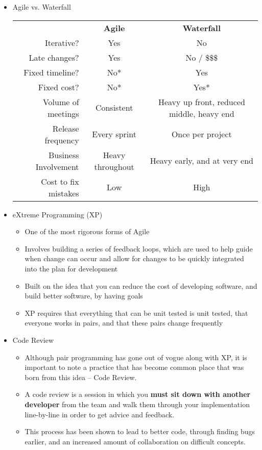 \begin{itemize}
	\item Agile vs. Waterfall\\
		\begin{table}[h]
			\centering
		\begin{tabular}{| r | c c |}
			\hline
			& \textbf{Agile} & \textbf{Waterfall}\\
			\cline{2-3}%
			Iterative? & \cellcolor{green!25}Yes & \cellcolor{green!15}No\\
			Late changes? & \cellcolor{green!25}Yes & \cellcolor{green!15}No / \$\$\$\\
			Fixed timeline? & \cellcolor{green!15}No* & \cellcolor{green!25}Yes\\
			Fixed cost? & \cellcolor{green!15}No* & \cellcolor{green!25}Yes*\\
			Volume of meetings & \cellcolor{green!25}Consistent & Heavy up front, reduced middle, heavy end\\
			Release frequency & \cellcolor{green!25}Every sprint & \cellcolor{green!15}Once per project\\
			Business Involvement & Heavy throughout & Heavy early, and at very end\\
			Cost to fix mistakes & \cellcolor{green!25}Low & \cellcolor{green!15}High\\
			\hline
		\end{tabular}
		\end{table}

	\item eXtreme Programming (XP)
	\begin{itemize}
		\item One of the most rigorous forms of Agile
		\item Involves building a series of feedback loops, which are used to help guide when change can occur and allow for changes to be quickly integrated into the plan for development
		\item Built on the idea that you can reduce the cost of developing software, and build better software, by having goals
		\item XP requires that everything that can be unit tested is unit tested, that everyone works in pairs, and that these pairs change frequently
	\end{itemize}

	\item Code Review
	\begin{itemize}
		\item Although pair programming has gone out of vogue along with XP, it is important to note a practice that has become common place that was born from this idea -- Code Review.
		\item A code review is a session in which you \textbf{must sit down with another developer} from the team and walk them through your implementation line-by-line in order to get advice and feedback.
		\item This process has been shown to lead to better code, through finding bugs earlier, and an increased amount of collaboration on difficult concepts.
	\end{itemize}


\end{itemize}
